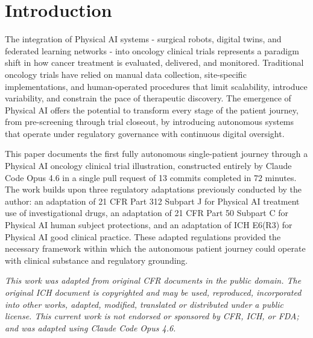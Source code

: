 \documentclass{article}
\begin{document}
\section{Introduction}
\label{sec:introduction}

\vspace{-0.1cm}

The integration of Physical AI systems - surgical robots, digital twins, and federated learning networks - into oncology clinical trials represents a paradigm shift in how cancer treatment is evaluated, delivered, and monitored. Traditional oncology trials have relied on manual data collection, site-specific implementations, and human-operated procedures that limit scalability, introduce variability, and constrain the pace of therapeutic discovery. The emergence of Physical AI offers the potential to transform every stage of the patient journey, from pre-screening through trial closeout, by introducing autonomous systems that operate under regulatory governance with continuous digital oversight.

This paper documents the first fully autonomous single-patient journey through a Physical AI oncology clinical trial illustration, constructed entirely by Claude Code Opus 4.6 in a single pull request of 13 commits completed in 72 minutes. The work builds upon three regulatory adaptations previously conducted by the author: an adaptation of 21 CFR Part 312 Subpart J for Physical AI treatment use of investigational drugs, an adaptation of 21 CFR Part 50 Subpart C for Physical AI human subject protections, and an adaptation of ICH E6(R3) for Physical AI good clinical practice. These adapted regulations provided the necessary framework within which the autonomous patient journey could operate with clinical substance and regulatory grounding.




{\footnotesize \textit{This work was adapted from original CFR documents in the public domain. The original ICH document is copyrighted and may be used, reproduced, incorporated into other works, adapted, modified, translated or distributed under a public license. This current work is not endorsed or sponsored by CFR, ICH, or FDA; and was adapted using Claude Code Opus 4.6.}}
\end{document}
